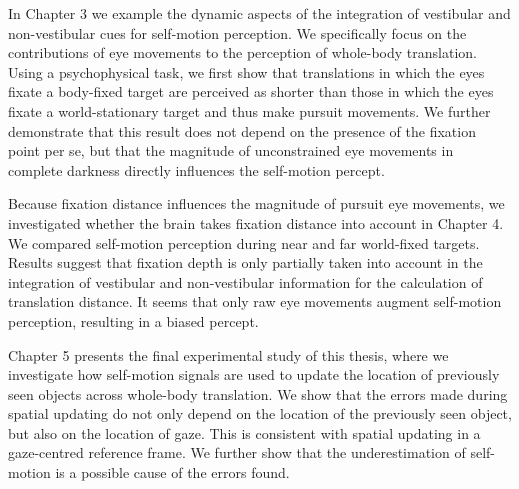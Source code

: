 In Chapter 3 we example the dynamic aspects of the integration of vestibular and non-vestibular cues for self-motion perception. We specifically focus on the contributions of eye movements to the perception of whole-body translation. Using a psychophysical task, we first show that translations in which the eyes fixate a body-fixed target are perceived as shorter than those in which the eyes fixate a world-stationary target and thus make pursuit movements. We further demonstrate that this result does not depend on the presence of the fixation point per se, but that the magnitude of unconstrained eye movements in complete darkness directly influences the self-motion percept. 

Because fixation distance influences the magnitude of pursuit eye movements, we investigated  whether the brain takes fixation distance into account in Chapter 4. We compared self-motion perception during near and far world-fixed targets. Results suggest that fixation depth is only partially taken into account in the integration of vestibular and non-vestibular information for the calculation of translation distance. It seems that only raw eye movements augment self-motion perception, resulting in a biased percept.

Chapter 5 presents the final experimental study of this thesis, where we investigate how self-motion signals are used to update the location of previously seen objects across whole-body translation. We show that the errors made during spatial updating do not only depend on the location of the previously seen object, but also on the location of gaze. This is consistent with spatial updating in a gaze-centred reference frame. We further show that the underestimation of self-motion is a possible cause of the errors found.
